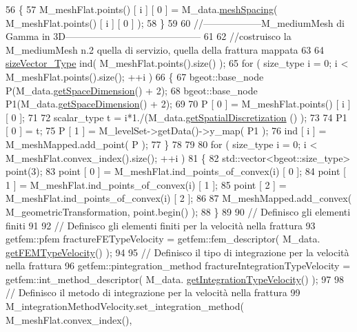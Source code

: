 \begin{DoxyCode}
56     \{
57         M\_meshFlat.points() [ i ] [ 0 ] = M\_data.\hyperlink{classFractureData_ab79d66dd830b6e1c55ade0d940c5c8cf}{meshSpacing}( M\_meshFlat.points() [ i ] [ 0 ] );
58     \}
59     
60     \textcolor{comment}{//------------------M\_mediumMesh di Gamma in 3D------------------------------------------}
61 
62     \textcolor{comment}{//costruisco la M\_mediumMesh n.2 quella di servizio, quella della frattura mappata}
63 
64     \hyperlink{Core_8h_a83c51913d041a5001e8683434c09857f}{sizeVector\_Type} ind( M\_meshFlat.points().size() );
65     \textcolor{keywordflow}{for} ( size\_type i = 0; i < M\_meshFlat.points().size(); ++i )
66     \{
67         bgeot::base\_node P(M\_data.\hyperlink{classFractureData_a4ead03266295fe14fa3285692f945d89}{getSpaceDimension}() + 2);
68         bgeot::base\_node P1(M\_data.\hyperlink{classFractureData_a4ead03266295fe14fa3285692f945d89}{getSpaceDimension}() + 2);
69         
70         P [ 0 ] = M\_meshFlat.points() [ i ] [ 0 ];
71 
72         scalar\_type t = i*1./(M\_data.\hyperlink{classFractureData_a5c10d579be7849be1a126c24982f8a23}{getSpatialDiscretization} () );
73 
74         P1 [ 0 ] = t;
75         P [ 1 ] =  M\_levelSet->getData()->y\_map( P1 );
76         ind [ i ] = M\_meshMapped.add\_point( P );
77     \}
78 
79 
80     \textcolor{keywordflow}{for} ( size\_type i = 0; i < M\_meshFlat.convex\_index().size(); ++i )
81     \{
82         std::vector<bgeot::size\_type> point(3);
83         point [ 0 ] = M\_meshFlat.ind\_points\_of\_convex(i) [ 0 ];
84         point [ 1 ] = M\_meshFlat.ind\_points\_of\_convex(i) [ 1 ];
85         point [ 2 ] = M\_meshFlat.ind\_points\_of\_convex(i) [ 2 ];
86 
87         M\_meshMapped.add\_convex( M\_geometricTransformation, point.begin() );
88     \}
89 
90     \textcolor{comment}{// Definisco gli elementi finiti}
91 
92     \textcolor{comment}{// Definisco gli elementi finiti per la velocità nella frattura}
93     getfem::pfem fractureFETypeVelocity = getfem::fem\_descriptor( M\_data.
      \hyperlink{classFractureData_a7396b67399a1ae8e5550841907c0dcb5}{getFEMTypeVelocity}() );
94 
95     \textcolor{comment}{// Definisco il tipo di integrazione per la velocità nella frattura}
96     getfem::pintegration\_method fractureIntegrationTypeVelocity = getfem::int\_method\_descriptor( M\_data.
      \hyperlink{classFractureData_a8a8a198482de6bf4104746bc1d0510c6}{getIntegrationTypeVelocity}() );
97 
98     \textcolor{comment}{// Definisco il metodo di integrazione per la velocità nella frattura}
99     M\_integrationMethodVelocity.set\_integration\_method( M\_meshFlat.convex\_index(), 

\end{DoxyCode}
